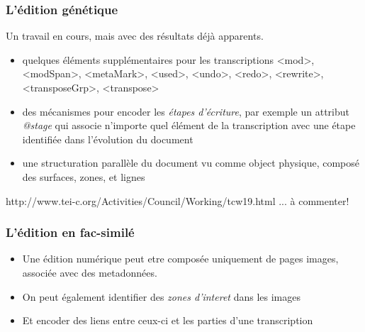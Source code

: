 \documentclass[]{beamer}\makeatletter
\begin{document}
\begin{frame}
\frametitle{L'édition génétique}\par
Un travail en cours, mais avec des résultats déjà apparents.\begin{itemize}

\item quelques éléments supplémentaires pour les transcriptions {\color{blue2}<mod>}, {\color{blue2}<modSpan>}, {\color{blue2}<metaMark>}, {\color{blue2}<used>}, {\color{blue2}<undo>}, {\color{blue2}<redo>}, {\color{blue2}<rewrite>}, {\color{blue2}<transposeGrp>}, {\color{blue2}<transpose>}
\item des mécanismes pour encoder les \emph{étapes d'écriture}, par exemple un attribut \emph{@stage} qui associe n'importe quel élément de la transcription avec une étape identifiée dans l'évolution du document
\item une structuration parallèle du document vu comme object physique, composé des surfaces, zones, et lignes 
\end{itemize} \par\begin{exampleblock}{}
http://www.tei-c.org/Activities/Council/Working/tcw19.html ... à commenter!\end{exampleblock}\par

\end{frame}

\begin{frame}
\frametitle{L'édition en fac-similé }\begin{itemize}

\item Une édition numérique peut etre composée uniquement de pages images, associée avec des metadonnées.  
\item  On peut également identifier des \emph{zones d'interet} dans les images 
\item  Et encoder des liens entre ceux-ci et les parties d'une transcription 
\end{itemize} 
\end{frame}
\end{document}
